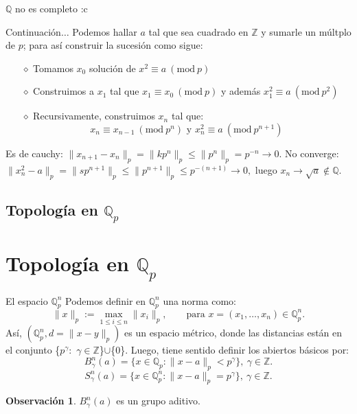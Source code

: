 \documentclass{beamer}
\theoremstyle{definition}
\numberwithin{equation}{section}
\newcommand{\redd}[1]{\textcolor{rkColor}{#1}}
\newtheorem{rr}{\redd{Observación}}
\newcommand{\Mod}[1]{\ (\mathrm{mod}\ #1)}
\renewcommand{\leq}{\leqslant}
\newcommand{\Z}{\mathbb{Z}}
\newcommand{\Q}{\mathbb{Q}}
\newcommand{\Qp}{\mathbb{Q}_p}
\newcommand{\Qpn}{\mathbb{Q}_p^n}
\newcommand{\pnorm}[1]{\|#1\|_p}
\begin{document}
\begin{frame}{$\Q$ no es completo :c}
	\begin{exampleblock}{Continuación$\dots$}
		Podemos hallar $a$ tal que sea cuadrado en $\Z$ y sumarle un múltplo de $p$; para así construir la sucesión como sigue:
		\begin{itemize}[<+- | alert@+>]
			\item[$\diamond$] Tomamos $x_0$ solución de $x^2\equiv a \Mod{p}$
			\item[$\diamond$] Construimos a $x_1$ tal que $x_1 \equiv x_0 \Mod{p}$ y además ${x_1^2\equiv a \Mod{p^2}}$ 
			\item[$\diamond$] Recursivamente, construimos $x_n$ tal que:
			$$x_n \equiv x_{n-1} \Mod{p^n} \text{ y } {x_n^2\equiv a \Mod{p^{n+1}}}$$
		\end{itemize}
	Es de cauchy: $  \pnorm{x_{n+1}-x_n} = \pnorm{kp^n} \leq \pnorm{p^n}=p^{-n}\rightarrow0.$\linebreak
	No converge: $\pnorm{x_n^2-a}=\pnorm{sp^{n+1}}\leq \pnorm{p^{n+1}}\leq p^{- (n+1)}\to 0,$
	luego $x_n\to \sqrt{a}\notin\Q$.
	\end{exampleblock}
\end{frame}
\fi
\subsection{Topología en $\Qp$}
\section*{Topología en $\Qp$}
\begin{frame}{El espacio $\Qpn$}
	Podemos definir en $\Qpn$ una norma como:\[
	\pnorm{x}:=\max_{1\leq i\leq n}\pnorm{x_i},\qquad\text{para }x= (x_{1},\dots,x_{n})\in\Qpn.
	\]
	Así, $(\Qpn, d=\pnorm{x-y})$ es un espacio métrico, donde las distancias están en el conjunto \{$p^\gamma$$\colon$ $\gamma\in\Z$\}$\cup$\{$0$\}. Luego, tiene sentido definir los abiertos básicos por:
	 \[
	 B^n_{\gamma} (a)=\{x\in\Qp:\pnorm{x-a}< p^{\gamma}\},\ \gamma\in \mathbb{Z}.
	 \]
	 \[
	 S^n_{\gamma} (a)=\{x\in\Qpn:\pnorm{x-a}=p^{\gamma}\},\ \gamma\in \mathbb{Z}.
	 \]
	 \begin{rr}
	 	$B_\gamma^n (a)$ es un grupo aditivo.
	 \end{rr}
\end{frame}
\end{document}
